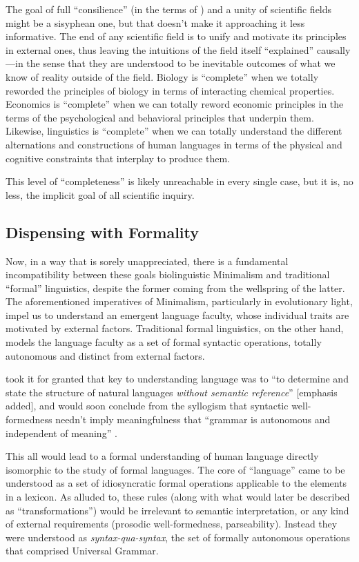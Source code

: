 \documentclass{article}
\begin{document}
The goal of full ``consilience'' (in the terms of \citet{wilson98}) and a unity of scientific fields might be a sisyphean one, but that doesn't make it approaching it less informative. The end of any scientific field is to unify and motivate its principles in external ones, thus leaving the intuitions of the field itself ``explained'' causally---in the sense that they are understood to be inevitable outcomes of what we know of reality outside of the field. Biology is ``complete'' when we totally reworded the principles of biology in terms of interacting chemical properties. Economics is ``complete'' when we can totally reword economic principles in the terms of the psychological and behavioral principles that underpin them. Likewise, linguistics is ``complete'' when we can totally understand the different alternations and constructions of human languages in terms of the physical and cognitive constraints that interplay to produce them.

This level of ``completeness'' is likely unreachable in every single case, but it is, no less, the implicit goal of all scientific inquiry.



\subsection{Dispensing with Formality}


Now, in a way that is sorely unappreciated, there is a fundamental incompatibility between these goals biolinguistic Minimalism and traditional ``formal'' linguistics, despite the former coming from the wellspring of the latter. The aforementioned imperatives of Minimalism, particularly in evolutionary light, impel us to understand an emergent language faculty, whose individual traits are motivated by external factors. Traditional formal linguistics, on the other hand, models the language faculty as a set of formal syntactic operations, totally autonomous and distinct from external factors.

\citet{chomsky53} took it for granted that key to understanding language was to ``to determine and state the structure of natural languages \emph{without semantic reference}'' [emphasis added], and would soon conclude from the syllogism that syntactic well-formedness needn't imply meaningfulness that ``grammar is autonomous and independent of meaning'' \citep{chomsky57}.


This all would lead to a formal understanding of human language directly isomorphic to the study of formal languages. The core of ``language'' came to be understood as a set of idiosyncratic formal operations applicable to the elements in a lexicon. As alluded to, these rules (along with what would later be described as ``transformations'') would be irrelevant to semantic interpretation, or any kind of external requirements (prosodic well-formedness, parseability). Instead they were understood as \textit{syntax-qua-syntax}, the set of formally autonomous operations that comprised Universal Grammar.
\end{document}
